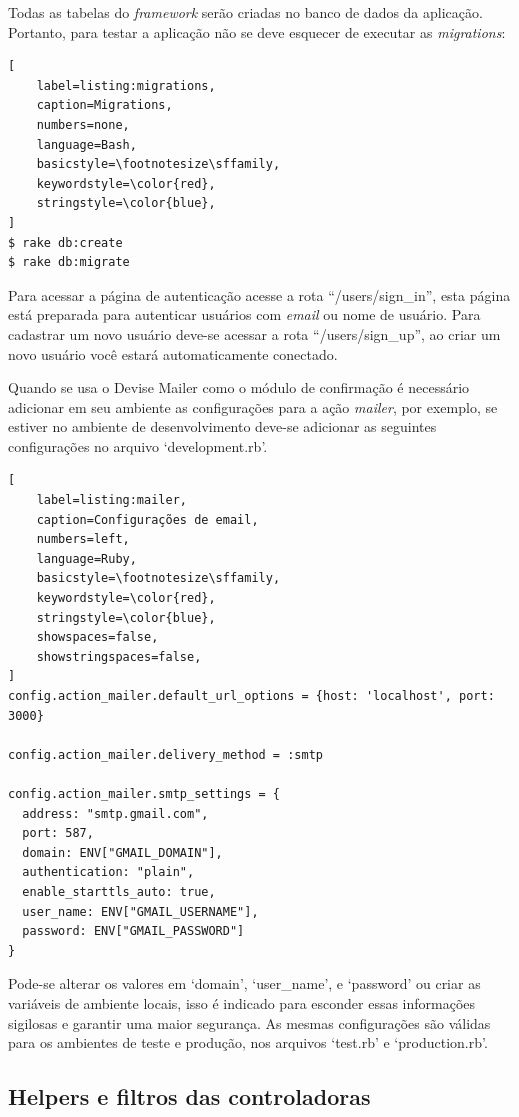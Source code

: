 Todas as tabelas do \textit{framework} serão criadas no banco de dados da aplicação. Portanto, para testar a aplicação não se deve esquecer de executar as \textit{migrations}:

\begin{lstlisting}[
    label=listing:migrations,
    caption=Migrations,
    numbers=none,
    language=Bash,
    basicstyle=\footnotesize\sffamily,
    keywordstyle=\color{red},
    stringstyle=\color{blue},
]
$ rake db:create
$ rake db:migrate
\end{lstlisting}

Para acessar a página de autenticação acesse a rota ``/users/sign\_in'', esta página está preparada para autenticar usuários com \textit{email} ou nome de usuário. Para cadastrar um novo usuário deve-se acessar a rota ``/users/sign\_up'', ao criar um novo usuário você estará automaticamente conectado.

Quando se usa o Devise Mailer como o módulo de confirmação é necessário adicionar em seu ambiente as configurações para a ação \textit{mailer}, por exemplo, se estiver no ambiente de desenvolvimento deve-se adicionar as seguintes configurações no arquivo `development.rb'.

\begin{lstlisting}[
    label=listing:mailer,
    caption=Configurações de email,
    numbers=left,
    language=Ruby,
    basicstyle=\footnotesize\sffamily,
    keywordstyle=\color{red},
    stringstyle=\color{blue},
    showspaces=false,
    showstringspaces=false,
]
config.action_mailer.default_url_options = {host: 'localhost', port: 3000}

config.action_mailer.delivery_method = :smtp

config.action_mailer.smtp_settings = {
  address: "smtp.gmail.com",
  port: 587,
  domain: ENV["GMAIL_DOMAIN"],
  authentication: "plain",
  enable_starttls_auto: true,
  user_name: ENV["GMAIL_USERNAME"],
  password: ENV["GMAIL_PASSWORD"]
}
\end{lstlisting}

Pode-se alterar os valores em `domain', `user\_name', e `password' ou criar as variáveis de ambiente locais, isso é indicado para esconder essas informações sigilosas e garantir uma maior segurança. As mesmas configurações são válidas para os ambientes de teste e produção, nos arquivos `test.rb' e `production.rb'.

\subsection{Helpers e filtros das controladoras}

